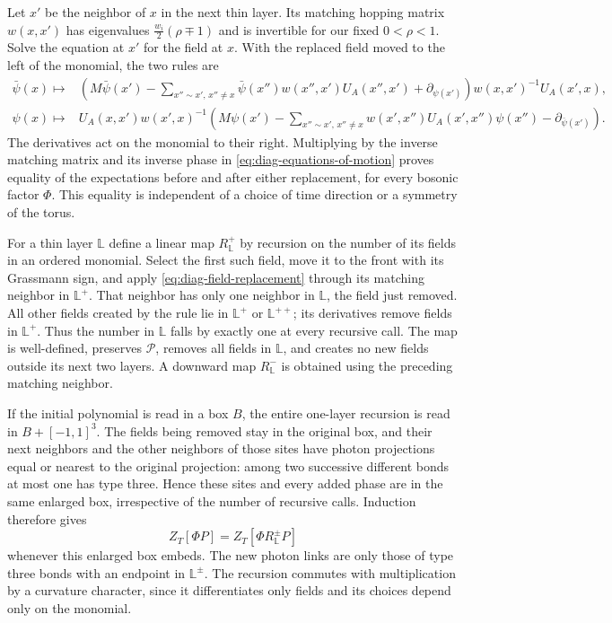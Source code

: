 Let $x'$ be the neighbor of $x$ in the next thin layer. Its
matching hopping matrix $w(x,x')$ has eigenvalues
$\frac{w_i}{2}(\rho\mp1)$ and is invertible for our fixed
$0<\rho<1$. Solve the equation at $x'$ for the field at $x$.
With the replaced field moved to the left of the monomial,
the two rules are
\begin{equation}\label{eq:diag-field-replacement}
 \begin{split}
 \bar\psi(x)\longmapsto{}&
 \left(M\bar\psi(x')-
   \sum_{x''\sim x',\,x''\ne x}\bar\psi(x'')w(x'',x')U_A(x'',x')
                  +\partial_{\psi(x')}\right)
                     w(x,x')^{-1}U_A(x',x),\\
 \psi(x)\longmapsto{}&U_A(x,x')w(x',x)^{-1}
 \left(M\psi(x')-
   \sum_{x''\sim x',\,x''\ne x}w(x',x'')U_A(x',x'')\psi(x'')
                  -\partial_{\bar\psi(x')}\right).
 \end{split}
\end{equation}
The derivatives act on the monomial to their right. Multiplying
by the inverse matching matrix and its inverse phase in
\eqref{eq:diag-equations-of-motion} proves equality of the
expectations before and after either replacement, for every
bosonic factor $\Phi$. This equality is independent of a choice
of time direction or a symmetry of the torus.

For a thin layer $\mathbb L$ define a linear map $R^+_{\mathbb L}$
by recursion on the number of its fields in an ordered monomial.
Select the first such field, move it to the front with its
Grassmann sign, and apply \eqref{eq:diag-field-replacement}
through its matching neighbor in $\mathbb L^+$. That neighbor
has only one neighbor in $\mathbb L$, the field just removed.
All other fields created by the rule lie in $\mathbb L^+$ or
$\mathbb L^{++}$; its derivatives remove fields in
$\mathbb L^+$. Thus the number in $\mathbb L$ falls by exactly
one at every recursive call. The map is well-defined, preserves
$\mathcal P$, removes all fields in $\mathbb L$, and creates
no new fields outside its next two layers. A downward map
$R^-_{\mathbb L}$ is obtained using the preceding matching
neighbor.

If the initial polynomial is read in a box $B$, the entire
one-layer recursion is read in $B+[-1,1]^3$. The fields being
removed stay in the original box, and their next neighbors
and the other neighbors of those sites have photon projections
equal or nearest to the original projection: among two successive
different bonds at most one has type three. Hence these sites
and every added phase are in the same enlarged box, irrespective
of the number of recursive calls. Induction therefore gives
\begin{equation}\label{eq:diag-thin-layer-identity}
 Z_T[\Phi P]=Z_T[\Phi R^\pm_{\mathbb L}P]
\end{equation}
whenever this enlarged box embeds. The new photon links are
only those of type three bonds with an endpoint in
$\mathbb L^\pm$. The recursion commutes with multiplication
by a curvature character, since it differentiates only fields
and its choices depend only on the monomial.

